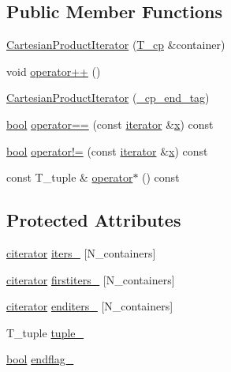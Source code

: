 \subsection*{Public Member Functions}
\begin{DoxyCompactItemize}
\item 
\hyperlink{classCartesianProductIterator_a10ee0e5f3293f781efdb7ab0b6ecf0aa}{Cartesian\+Product\+Iterator} (\hyperlink{classCartesianProductIterator_a4aca90c681d7dffbe5082c6ec9bda77e}{T\+\_\+cp} \&container)
\item 
void \hyperlink{classCartesianProductIterator_a90254a025247f49ee9b05b5a915f10e3}{operator++} ()
\item 
\hyperlink{classCartesianProductIterator_a1b0b44f653b31419f0a670326487a5f2}{Cartesian\+Product\+Iterator} (\hyperlink{struct__cp__end__tag}{\+\_\+cp\+\_\+end\+\_\+tag})
\item 
\hyperlink{compiler_8h_abb452686968e48b67397da5f97445f5b}{bool} \hyperlink{classCartesianProductIterator_ad2237b54bb3bad2841d3fd304bbca40e}{operator==} (const \hyperlink{classCartesianProductIterator_a68eb421dce636a204a0e0b97eaf01e4b}{iterator} \&\hyperlink{vecnorm1_8cc_ac73eed9e41ec09d58f112f06c2d6cb63}{x}) const 
\item 
\hyperlink{compiler_8h_abb452686968e48b67397da5f97445f5b}{bool} \hyperlink{classCartesianProductIterator_a61a1da8e281a8f01f566c2ad1138f991}{operator!=} (const \hyperlink{classCartesianProductIterator_a68eb421dce636a204a0e0b97eaf01e4b}{iterator} \&\hyperlink{vecnorm1_8cc_ac73eed9e41ec09d58f112f06c2d6cb63}{x}) const 
\item 
const T\+\_\+tuple \& \hyperlink{classCartesianProductIterator_aef9b7676bad87e3eb67b9a2f9ec085e3}{operator$\ast$} () const 
\end{DoxyCompactItemize}
\subsection*{Protected Attributes}
\begin{DoxyCompactItemize}
\item 
\hyperlink{classCartesianProductIterator_a8cfe16c0d4694b851a0084e1c309c896}{citerator} \hyperlink{classCartesianProductIterator_a1e544072a919e0e47fd9d243882586f3}{iters\+\_\+} \mbox{[}N\+\_\+containers\mbox{]}
\item 
\hyperlink{classCartesianProductIterator_a8cfe16c0d4694b851a0084e1c309c896}{citerator} \hyperlink{classCartesianProductIterator_acda528d9fbc0beebfb5dd277937e03bb}{firstiters\+\_\+} \mbox{[}N\+\_\+containers\mbox{]}
\item 
\hyperlink{classCartesianProductIterator_a8cfe16c0d4694b851a0084e1c309c896}{citerator} \hyperlink{classCartesianProductIterator_a6b20c59d08f4bcfe061dad5990881256}{enditers\+\_\+} \mbox{[}N\+\_\+containers\mbox{]}
\item 
T\+\_\+tuple \hyperlink{classCartesianProductIterator_a7e30094bf632ae9191ed3050bee6281f}{tuple\+\_\+}
\item 
\hyperlink{compiler_8h_abb452686968e48b67397da5f97445f5b}{bool} \hyperlink{classCartesianProductIterator_a4b6b61aa97430f48f854a76f66736357}{endflag\+\_\+}
\end{DoxyCompactItemize}


